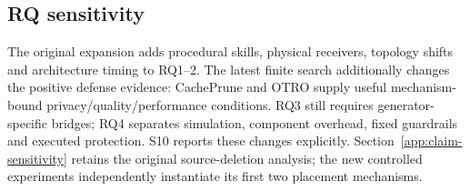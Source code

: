 \subsection{RQ sensitivity}\label{app:rq-sensitivity}
The original expansion adds procedural skills, physical receivers, topology shifts and architecture timing to RQ1--2. The latest finite search additionally changes the positive defense evidence: CachePrune and OTRO supply useful mechanism-bound privacy/quality/performance conditions. RQ3 still requires generator-specific bridges; RQ4 separates simulation, component overhead, fixed guardrails and executed protection. S10 reports these changes explicitly. Section~\ref{app:claim-sensitivity} retains the original source-deletion analysis; the new controlled experiments independently instantiate its first two placement mechanisms.
